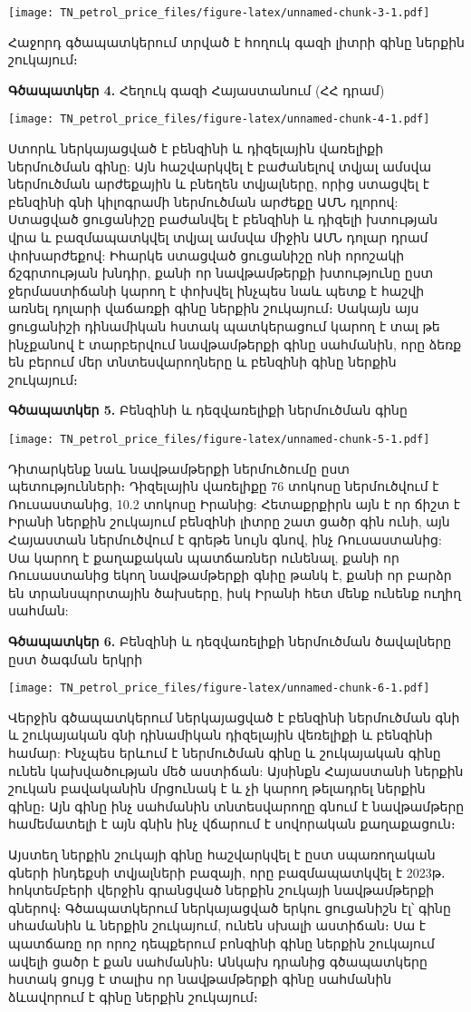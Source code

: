 \documentclass[
]{article}
\begin{document}
\texttt{[image: TN\_petrol\_price\_files/figure-latex/unnamed-chunk-3-1.pdf]}

Հաջորդ գծապատկերում տրված է հողուկ գազի լիտրի գինը ներքին շուկայում։

\textbf{Գծապատկեր 4.} Հեղուկ գազի Հայաստանում (ՀՀ դրամ)

\texttt{[image: TN\_petrol\_price\_files/figure-latex/unnamed-chunk-4-1.pdf]}

Ստորև ներկայացված է բենզինի և դիզելային վառելիքի ներմուծման գինը: Այն
հաշվարկվել է բաժանելով տվյալ ամսվա ներմուծման արժեքային և բնեղեն
տվյալները, որից ստացվել է բենզինի գնի կիլոգրամի ներմուծման արժեքը ԱՄՆ
դլորով: Ստացված ցուցանիշը բաժանվել է բենզինի և դիզելի խտության վրա և
բազմապատկվել տվյալ ամսվա միջին ԱՄՆ դոլար դրամ փոխարժեքով: Իհարկե ստացված
ցուցանիշը ոնի որոշակի ճշգրտության խնդիր, քանի որ նավթամթերքի խտությունը
ըստ ջերմաստիճանի կարող է փոխվել ինչպես նաև պետք է հաշվի առնել դոլարի
վաճառքի գինը ներքին շուկայում։ Սակայն այս ցուցանիշի դինամիկան հստակ
պատկերացում կարող է տալ թե ինչքանով է տարբերվում նավթամթերքի գինը
սահմանին, որը ձեռք են բերում մեր տնտեսվարողները և բենզինի գինը ներքին
շուկայում։

\textbf{Գծապատկեր 5.} Բենզինի և դեզվառելիքի ներմուծման գինը

\texttt{[image: TN\_petrol\_price\_files/figure-latex/unnamed-chunk-5-1.pdf]}

Դիտարկենք նաև նավթամթերքի ներմուծումը ըստ պետությունների։ Դիզելային
վառելիքը 76 տոկոսը ներմուծվում է Ռուսաստանից, 10.2 տոկոսը Իրանից:
Հետաքրքիրն այն է որ ճիշտ է Իրանի ներքին շուկայում բենզինի լիտրը շատ ցածր
գին ունի, այն Հայաստան ներմուծվում է գրեթե նույն գնով, ինչ Ռուսաստանից:
Սա կարող է քաղաքական պատճառներ ունենալ, քանի որ Ռուսաստանից եկող
նավթամթերքի գնիը թանկ է, քանի որ բարձր են տրանսպորտային ծախսերը, իսկ
Իրանի հետ մենք ունենք ուղիղ սահման:

\textbf{Գծապատկեր 6.} Բենզինի և դեզվառելիքի ներմուծման ծավալները ըստ
ծագման երկրի

\texttt{[image: TN\_petrol\_price\_files/figure-latex/unnamed-chunk-6-1.pdf]}

Վերջին գծապատկերում ներկայացված է բենզինի ներմուծման գնի և շուկայական
գնի դինամիկան դիզելային վեռելիքի և բենզինի համար: Ինչպես երևում է
ներմուծման գինը և շուկայական գինը ունեն կախվածության մեծ աստիճան:
Այսինքն Հայաստանի ներքին շուկան բավականին մրցունակ է և չի կարող թելադրել
ներքին գինը։ Այն գինը ինչ սահմանին տնտեսվարողը գնում է նավթամթերը
համեմատելի է այն գնին ինչ վճարում է սովորական քաղաքացուն։

Այստեղ ներքին շուկայի գինը հաշվարկվել է ըստ սպառողական գների ինդեքսի
տվյալների բազայի, որը բազմապատկվել է 2023թ․ հոկտեմբերի վերջին գրանցված
ներքին շուկայի նավթամթերքի գներով։ Գծապատկերում ներկայացված երկու
ցուցանիշն էլ՝ գինը սհամանին և ներքին շուկայում, ունեն սխալի աստիճան։ Սա
է պատճառը որ որոշ դեպքերում բոնզինի գինը ներքին շուկայում ավելի ցածր է
քան սահմանին։ Անկախ դրանից գծապատկերը հստակ ցույց է տալիս որ նավթամթերքի
գինը սահմանին ձևավորում է գինը ներքին շուկայում։
\end{document}
